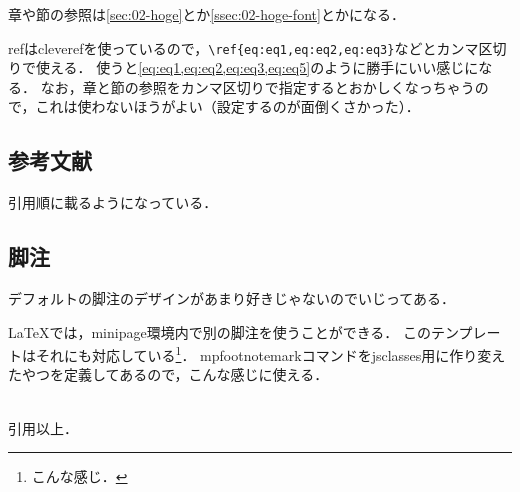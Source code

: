 章や節の参照は\cref{sec:02-hoge}とか\cref{ssec:02-hoge-font}とかになる．

refはcleverefを使っているので，\verb|\ref{eq:eq1,eq:eq2,eq:eq3}|などとカンマ区切りで使える．
使うと\cref{eq:eq1,eq:eq2,eq:eq3,eq:eq5}のように勝手にいい感じになる．
なお，章と節の参照をカンマ区切りで指定するとおかしくなっちゃうので，これは使わないほうがよい（設定するのが面倒くさかった）．

\subsection{参考文献}

\par 引用順に載るようになっている．

\subsection{脚注}

デフォルトの脚注のデザインがあまり好きじゃないのでいじってある．

\begin{center}
    \begin{minipage}{0.6\linewidth}
        \LaTeX{}では，minipage環境内で別の脚注を使うことができる．
        このテンプレートはそれにも対応している\footnote{こんな感じ．}．
        mpfootnotemarkコマンドをjsclasses用に作り変えたやつを定義してあるので，こんな感じに使える\mpfootnotemark[765]．
    \end{minipage}
\end{center}
\hrulefill\\引用以上．






